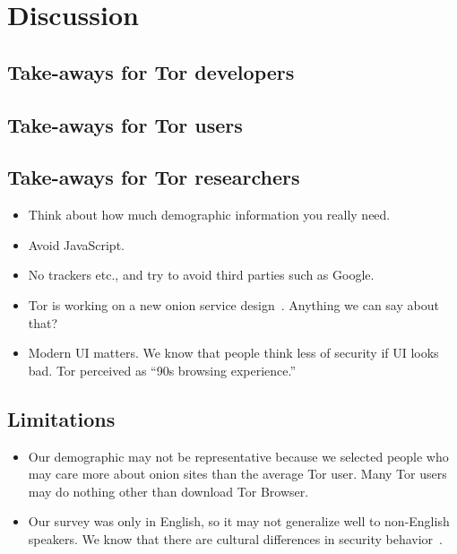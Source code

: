 \section{Discussion}
\label{sec:discussion}

\subsection{Take-aways for Tor developers}
\subsection{Take-aways for Tor users}
\subsection{Take-aways for Tor researchers}
\begin{itemize}
    \item Think about how much demographic information you really need.
    \item Avoid JavaScript.
    \item No trackers etc., and try to avoid third parties such as Google.
\end{itemize}

\begin{itemize}
    \item Tor is working on a new onion service design~\cite{Mathewson2013a}.
        Anything we can say about that?
    \item Modern UI matters.  We know that people think less of security if UI
        looks bad.  Tor perceived as ``90s browsing experience.''
\end{itemize}

\subsection{Limitations}
\begin{itemize}
    \item Our demographic may not be representative because we selected people
        who may care more about onion sites than the average Tor user.  Many
        Tor users may do nothing other than download Tor Browser.
    \item Our survey was only in English, so it may not generalize well to
        non-English speakers.  We know that there are cultural differences in
        security behavior~\cite{Sawaya2017a}.
\end{itemize}
